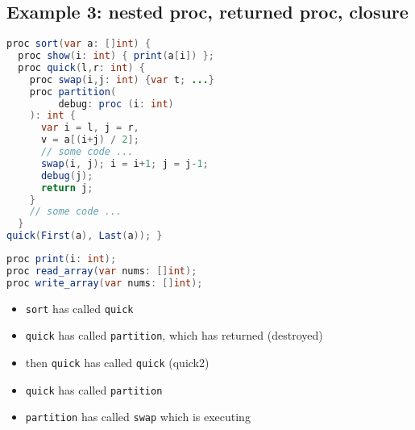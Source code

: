 \documentclass[10pt,a4paper,landscape]{article}
\begin{document}
\begin{multicols*}{3}
\section*{Example 3: nested proc, returned proc, closure}
\begin{minipage}{.58\linewidth}
  \begin{lstlisting}[language=java,xleftmargin=-2em,frame=none]
proc sort(var a: []int) {
  proc show(i: int) { print(a[i]) };
  proc quick(l,r: int) {
    proc swap(i,j: int) {var t; ...}
    proc partition(
         debug: proc (i: int)
    ): int {
      var i = l, j = r,
      v = a[(i+j) / 2];
      // some code ...
      swap(i, j); i = i+1; j = j-1;
      debug(j);
      return j;
    }
    // some code ...
  }
quick(First(a), Last(a)); }
\end{lstlisting}
\end{minipage}
\begin{minipage}{.42\linewidth}
\begin{lstlisting}[language=java,frame=none]
proc print(i: int);
proc read_array(var nums: []int);
proc write_array(var nums: []int);
\end{lstlisting}
  \flushleft
  \begin{itemize}
  \item \texttt{sort} has called \texttt{quick}
  \item \texttt{quick} has called \texttt{partition}, which has returned (destroyed)
  \item then \texttt{quick} has called \texttt{quick} (quick2)
  \item \texttt{quick} has called \texttt{partition}
  \item \texttt{partition} has called \texttt{swap} which is executing
  \end{itemize}
\end{minipage}
\begin{minipage}{\linewidth}
  \centering
\end{minipage}
\end{multicols*}
\end{document}
